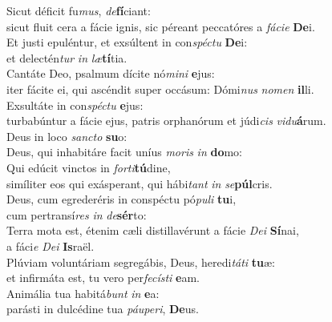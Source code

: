 \evenverse Sicut déficit fu\textit{mus}, \textit{de}\textbf{fí}ciant:~\*\\
\evenverse sicut fluit cera a fácie ignis, sic péreant peccatóres a \textit{fá}\textit{ci}\textit{e} \textbf{De}i.\\
\oddverse Et justi epuléntur, et exsúltent in con\textit{spé}\textit{ctu} \textbf{De}i:~\*\\
\oddverse et delectén\textit{tur} \textit{in} \textit{læ}\textbf{tí}tia.\\
\evenverse Cantáte Deo, psalmum dícite nó\textit{mi}\textit{ni} \textbf{e}jus:~\*\\
\evenverse iter fácite ei, qui ascéndit super occásum: Dómi\textit{nus} \textit{no}\textit{men} \textbf{il}li.\\
\oddverse Exsultáte in con\textit{spé}\textit{ctu} \textbf{e}jus:~\*\\
\oddverse turbabúntur a fácie ejus, patris orphanórum et júdi\textit{cis} \textit{vi}\textit{du}\textbf{á}rum.\\
\evenverse Deus in loco \textit{san}\textit{cto} \textbf{su}o:~\*\\
\evenverse Deus, qui inhabitáre facit uníus \textit{mo}\textit{ris} \textit{in} \textbf{do}mo:\\
\oddverse Qui edúcit vinctos in \textit{for}\textit{ti}\textbf{tú}dine,~\*\\
\oddverse simíliter eos qui exásperant, qui hábi\textit{tant} \textit{in} \textit{se}\textbf{púl}cris.\\
\evenverse Deus, cum egrederéris in conspéctu pó\textit{pu}\textit{li} \textbf{tu}i,~\*\\
\evenverse cum pertransí\textit{res} \textit{in} \textit{de}\textbf{sér}to:\\
\oddverse Terra mota est, étenim cæli distillavérunt a fácie \textit{De}\textit{i} \textbf{Sí}nai,~\*\\
\oddverse a fáci\textit{e} \textit{De}\textit{i} \textbf{Is}raël.\\
\evenverse Plúviam voluntáriam segregábis, Deus, heredi\textit{tá}\textit{ti} \textbf{tu}æ:~\*\\
\evenverse et infirmáta est, tu vero per\textit{fe}\textit{cí}\textit{sti} \textbf{e}am.\\
\oddverse Animália tua habitá\textit{bunt} \textit{in} \textbf{e}a:~\*\\
\oddverse parásti in dulcédine tua \textit{páu}\textit{pe}\textit{ri}, \textbf{De}us.\\
